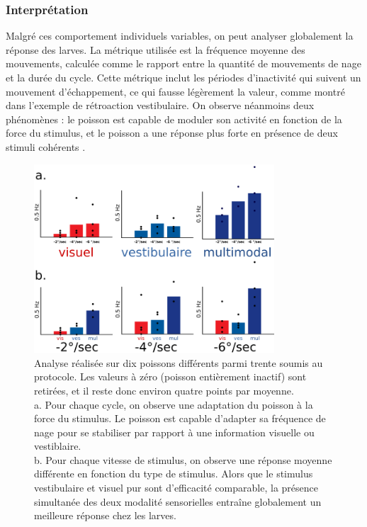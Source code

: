 
\subsubsection{Interprétation}
Malgré ces comportement individuels variables, on peut analyser globalement la réponse des larves. La métrique utilisée est la fréquence moyenne des mouvements, calculée comme le rapport entre la quantité de mouvements de nage et la durée du cycle. Cette métrique inclut les périodes d'inactivité qui suivent un mouvement d'échappement, ce qui fausse légèrement la valeur, comme montré dans l'exemple de rétroaction vestibulaire. On observe néanmoins deux phénomènes : le poisson est capable de moduler son activité en fonction de la force du stimulus, et le poisson a une réponse plus forte en présence de deux stimuli cohérents .

\begin{figure}
\centering
\includegraphics[width=0.8\textwidth]{./files/stats.svg.png}
\caption{
Analyse réalisée sur dix poissons différents parmi trente soumis au protocole. Les valeurs à zéro (poisson entièrement inactif) sont retirées, et il reste donc environ quatre points par moyenne.
\\
a. Pour chaque cycle, on observe une adaptation du poisson à la force du stimulus. Le poisson est capable d'adapter sa fréquence de nage pour se stabiliser par rapport à une information visuelle ou vestiblaire.
\\
b. Pour chaque vitesse de stimulus, on observe une réponse moyenne différente en fonction du type de stimulus. Alors que le stimulus vestibulaire et visuel pur sont d'efficacité comparable, la présence simultanée des deux modalité sensorielles entraîne globalement un meilleure réponse chez les larves.
}
\end{figure}


